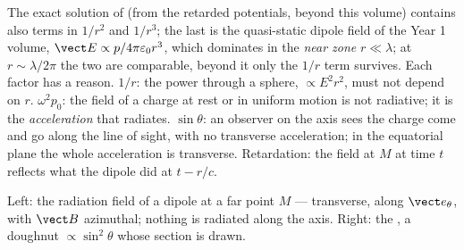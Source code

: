 \begin{remark}\label{rem:b2:dipole-radiation:reading}
The exact solution of  (from the retarded
potentials, beyond this volume) contains also terms in $1/r^2$ and
$1/r^3$; the last is the quasi-static dipole field of the Year 1
volume, $\vect E \propto p/4\pi\varepsilon_0r^3$, which dominates in the \emph{near
zone} $r \ll \lambda$; at $r \sim \lambda/2\pi$ the two are comparable, beyond it
only the $1/r$ term survives. Each factor has a reason. $1/r$: the
power through a sphere, $\propto E^2r^2$, must not depend on $r$. $\omega^2p_0$:
the field of a charge at rest or in uniform motion is not radiative; it
is the \emph{acceleration} that radiates. $\sin\theta$: an observer on the
axis sees the charge come and go along the line of sight, with no
transverse acceleration; in the equatorial plane the whole
acceleration is transverse. Retardation: the field at $M$ at time $t$
reflects what the dipole did at $t - r/c$.
\end{remark}

\begin{omfigure}

{\small Left: the radiation field of a dipole at a far point $M$ ---
transverse, along $\vect e_\theta$, with $\vect B$ azimuthal; nothing is
radiated along the axis. Right: the , a doughnut
$\propto\sin^2\theta$ whose section is drawn.}
\end{omfigure}

